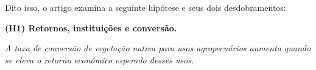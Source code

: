 

Dito isso, o artigo examina a seguinte hipótese e seus dois desdobramentos:


\medskip

\noindent\textbf{(H1) Retornos, instituições e conversão.}

\noindent\emph{A taxa de conversão de vegetação nativa para usos agropecuários aumenta quando se eleva o retorno econômico esperado desses usos.}

%
%
%
%
%
%
%
%
%

